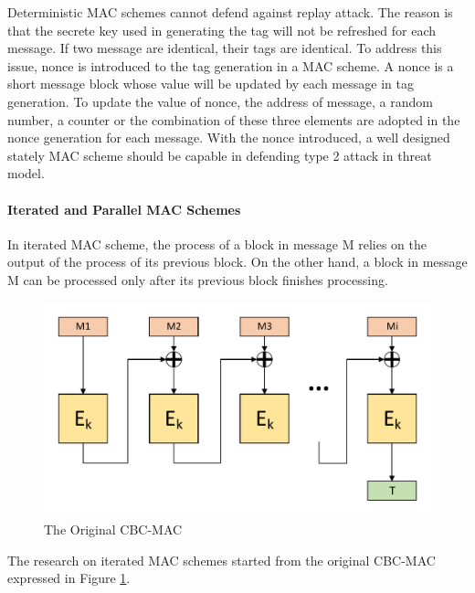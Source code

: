 \documentclass{article}
\begin{document}
Deterministic MAC schemes cannot defend against replay attack. The reason is that the secrete key used in generating the tag will not be refreshed for each message. If two message are identical, their tags are identical. To address this issue, nonce is introduced to the tag generation in a MAC scheme. A nonce is a short message block whose value will be updated by each message in tag generation. To update the value of nonce, the address of message, a random number, a counter or the combination of these three elements are adopted in the nonce generation for each message. With the nonce introduced, a well designed stately MAC scheme should be capable in defending type 2 attack in threat model.

\paragraph{Iterated and Parallel MAC Schemes}
In iterated MAC scheme, the process of a block in message M relies on the output of the process of its previous block. On the other hand, a block in message M can be processed only after its previous block finishes processing. 
\begin{figure}[htbp]
\centering
\includegraphics[scale=0.3]{./diagrams/cbc-mac.pdf}
\caption{The Original CBC-MAC}
\label{fig:CBC-mac}
\end{figure}
The research on iterated MAC schemes started from the original CBC-MAC expressed in Figure \ref{fig:CBC-mac}.
\end{document}
